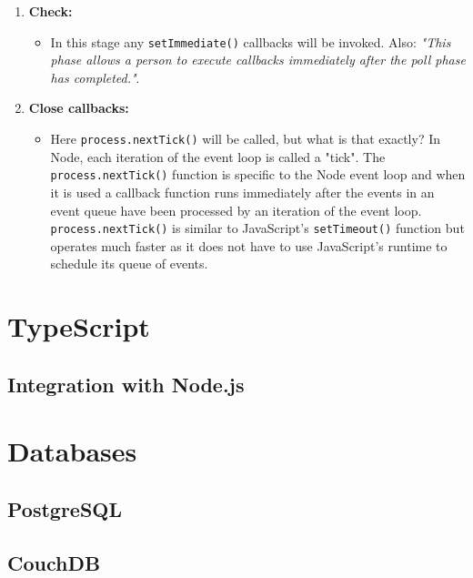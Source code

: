 \begin{enumerate}
\begin{itemize}
	\end{itemize}
\item \textbf{Check:}
	\begin{itemize}
	\item In this stage any \verb|setImmediate()| callbacks will be invoked. Also: \emph{"This phase allows a person to execute callbacks immediately after the poll phase has completed."}\cite{node}.
	\end{itemize}
\item \textbf{Close callbacks:}
	\begin{itemize}
	\item Here \verb|process.nextTick()| will be called, but what is that exactly? In Node, each iteration of the event loop is called a "tick". The  \verb|process.nextTick()| function is specific to the Node event loop and when it is used a callback function runs immediately after the events in an event queue have been processed by an iteration of the event loop.  \verb|process.nextTick()| is similar to JavaScript's \verb|setTimeout()| function but operates much faster as it does not have to use JavaScript's runtime to schedule its queue of events.
	\end{itemize}
\end{enumerate}

\section{TypeScript}
\subsection{Integration with Node.js}

\section{Databases}
\subsection{PostgreSQL}
\subsection{CouchDB} %
